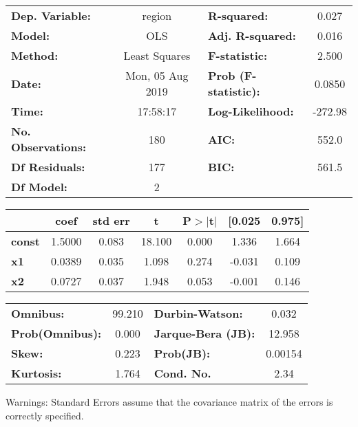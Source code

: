\begin{center}
\begin{tabular}{lclc}
\toprule
\textbf{Dep. Variable:}    &      region      & \textbf{  R-squared:         } &     0.027   \\
\textbf{Model:}            &       OLS        & \textbf{  Adj. R-squared:    } &     0.016   \\
\textbf{Method:}           &  Least Squares   & \textbf{  F-statistic:       } &     2.500   \\
\textbf{Date:}             & Mon, 05 Aug 2019 & \textbf{  Prob (F-statistic):} &   0.0850    \\
\textbf{Time:}             &     17:58:17     & \textbf{  Log-Likelihood:    } &   -272.98   \\
\textbf{No. Observations:} &         180      & \textbf{  AIC:               } &     552.0   \\
\textbf{Df Residuals:}     &         177      & \textbf{  BIC:               } &     561.5   \\
\textbf{Df Model:}         &           2      & \textbf{                     } &             \\
\bottomrule
\end{tabular}
\begin{tabular}{lcccccc}
               & \textbf{coef} & \textbf{std err} & \textbf{t} & \textbf{P$> |$t$|$} & \textbf{[0.025} & \textbf{0.975]}  \\
\midrule
\textbf{const} &       1.5000  &        0.083     &    18.100  &         0.000        &        1.336    &        1.664     \\
\textbf{x1}    &       0.0389  &        0.035     &     1.098  &         0.274        &       -0.031    &        0.109     \\
\textbf{x2}    &       0.0727  &        0.037     &     1.948  &         0.053        &       -0.001    &        0.146     \\
\bottomrule
\end{tabular}
\begin{tabular}{lclc}
\textbf{Omnibus:}       & 99.210 & \textbf{  Durbin-Watson:     } &    0.032  \\
\textbf{Prob(Omnibus):} &  0.000 & \textbf{  Jarque-Bera (JB):  } &   12.958  \\
\textbf{Skew:}          &  0.223 & \textbf{  Prob(JB):          } &  0.00154  \\
\textbf{Kurtosis:}      &  1.764 & \textbf{  Cond. No.          } &     2.34  \\
\bottomrule
\end{tabular}
\end{center}

Warnings: \newline
 [1] Standard Errors assume that the covariance matrix of the errors is correctly specified.